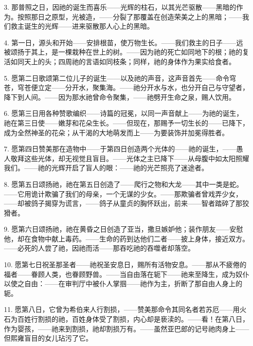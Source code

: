 3. 那普照之日，因祂的诞生而喜乐——光辉的柱石，以其光芒驱散——黑暗的作为。按照那日之原型，光被造，——分裂了那覆盖在创造荣美之上的黑暗；——我们救主诞生的光辉——进来驱散那人心上的黑暗。\par

4. 第一日，源头和开始——安排根苗，使万物生长。——我们救主的日子——远被颂扬于其上，是一棵栽种在世上的树。——因为祂的死亡如同地下的根；祂的复活如同天上的头；四周祂的言语如同枝条；同样，祂的身体作为果实给食者。\par

5. 愿第二日歌颂第二位儿子的诞生——以及祂的声音，这声音首先——命令穹苍，穹苍便立定——分开水，聚集海。——祂分开水与水，也分开自己与守望者，降下到人间。——因为那水祂曾命令聚集，——祂劈开生命之泉，赐人饮用。\par

6. 愿第三日用各种赞歌编织——诗篇的冠冕，以同一声音献上——为祂的诞生，祂在第三日使——嫩芽和花朵生长。——但现在，那赐予一切生长的——已降下，成为全然神圣的花朵；从干渴的大地萌发而上——为要装饰并加冕得胜者。\par

7. 愿第四日赞美那在造物中——于第四日创造两个光体的——祂的诞生，——愚人敬拜这些光体，却无视觉且盲目。——光体之主已降下——从母腹中如太阳照耀我们。——祂的光辉开启了盲人的眼：——祂的光芒照亮了迷途者。\par

8. 愿第五日颂扬祂，祂在第五日创造了——爬行之物和大龙——其中一类是蛇。——它用诡计欺骗了我们的母亲，一个无谋的少女。——那欺骗者曾戏弄少女，——却被鸽子揭穿为谎言，——鸽子从童贞的胸怀跃出，前来——智者踏碎了那狡猾者。\par

9. 愿第六日颂扬祂，祂在黄昏之日创造了亚当，撒旦嫉妒他；装作朋友——安慰他，却在食物中献上毒药。——生命的药到达他们二者——披上身体，接近双方。——必死的人尝了祂，因祂而活——那吞吃祂的吞噬者却落空。\par

10. 愿第七日祝圣那圣者——祂祝圣安息日，赐所有活物安息。——那从不疲倦的福者——眷顾人类，也眷顾野兽。——当自由落在轭下——祂来至降生，成为奴仆以使之自由：——在审判厅中被仆人掌掴——祂作为主，折断了那自由人身上的轭。\par

11. 愿第八日，它曾为希伯来人行割损，——赞美那命令其同名者若苏厄——用火石为百姓行割损的祂，百姓身体受了割损，内心却是亵渎的。——看！在第八日，作为婴孩，——祂来到割损，祂却割损万有。——虽然亚巴郎的记号祂肉身上——但熙雍盲目的女儿玷污了它。\par

